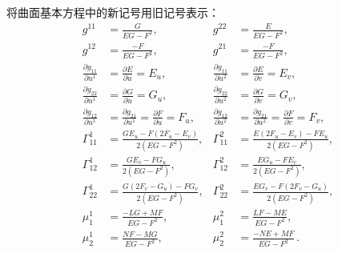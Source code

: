 \begin{notation}
    将曲面基本方程中的新记号用旧记号表示：
    \begin{align*}
        g^{11}                               & =\frac{G}{EG-F^2},                                                       &
        g^{22}                               & =\frac{E}{EG-F^2},                                                         \\
        g^{12}                               & =\frac{-F}{EG-F^2},                                                      &
        g^{21}                               & =\frac{-F}{EG-F^2},                                                        \\
        \frac{\partial g_{11}}{\partial u^1} & =\frac{\partial E}{\partial u}=E_u,                                      &
        \frac{\partial g_{11}}{\partial u^2} & =\frac{\partial E}{\partial v}=E_v,                                        \\
        \frac{\partial g_{22}}{\partial u^1} & =\frac{\partial G}{\partial u}=G_u,                                      &
        \frac{\partial g_{22}}{\partial u^2} & =\frac{\partial G}{\partial v}=G_v,                                        \\
        \frac{\partial g_{12}}{\partial u^1} & =\frac{\partial g_{21}}{\partial u^1}=\frac{\partial F}{\partial u}=F_u, &
        \frac{\partial g_{12}}{\partial u^2} & =\frac{\partial g_{21}}{\partial u^2}=\frac{\partial F}{\partial v}=F_v,   \\
        \varGamma_{11}^1                     & =\frac{GE_u-F(2F_u-E_v)}{2(EG-F^2)},                                     &
        \varGamma_{11}^2                     & =\frac{E(2F_u-E_v)-FE_u}{2(EG-F^2)},                                       \\
        \varGamma_{12}^1                     & =\frac{GE_v-FG_u}{2(EG-F^2)},                                            &
        \varGamma_{12}^2                     & =\frac{EG_u-FE_v}{2(EG-F^2)},                                              \\
        \varGamma_{22}^1                     & =\frac{G(2F_v-G_u)-FG_v}{2(EG-F^2)},                                     &
        \varGamma_{22}^2                     & =\frac{EG_v-F(2F_v-G_u)}{2(EG-F^2)},                                       \\
        \mu_1^1                              & =\frac{-LG+MF}{EG-F^2},                                                  &
        \mu_1^2                              & =\frac{LF-ME}{EG-F^2},                                                     \\
        \mu_2^1                              & =\frac{NF-MG}{EG-F^2},                                                   &
        \mu_2^2                              & =\frac{-NE+MF}{EG-F^2}\, .
    \end{align*}
\end{notation}